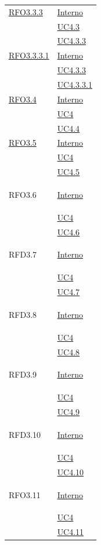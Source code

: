 \begin{itemize}
\begin{itemize}
\begin{itemize}
\begin{itemize}
\begin{longtable}{|>{\centering}m{5cm}|m{5cm}<{\centering}|}
\hyperlink{RFO3.3.3}{RFO3.3.3} & \hyperlink{Interno}{Interno}\\
& \hyperref[UC4.3]{UC4.3}\\
& \hyperref[UC4.3.3]{UC4.3.3}\\ \hline

\hyperlink{RFO3.3.3.1}{RFO3.3.3.1} & \hyperlink{Interno}{Interno}\\
& \hyperref[UC4.3.3]{UC4.3.3}\\
& \hyperref[UC4.3.3.1]{UC4.3.3.1}\\ \hline

\hyperlink{RFO3.4}{RFO3.4} & \hyperlink{Interno}{Interno}\\
& \hyperref[UC4]{UC4}\\
& \hyperref[UC4.4]{UC4.4}\\ \hline

\hyperlink{RFO3.5}{RFO3.5} & \hyperlink{Interno}{Interno}\\
& \hyperref[UC4]{UC4}\\
& \hyperref[UC4.5]{UC4.5}\\ \hline

\hypertarget{RFO3.6}{RFO3.6} & \hyperlink{Interno}{Interno}\\
&\hyperref[UC4]{UC4}\\
&\hyperref[UC4.6]{UC4.6}\\ \hline

\hypertarget{RFD3.7}{RFD3.7} & \hyperlink{Interno}{Interno}\\
& \hyperref[UC4]{UC4}\\
& \hyperref[UC4.7]{UC4.7}\\ \hline

\hypertarget{RFD3.8}{RFD3.8} & \hyperlink{Interno}{Interno}\\
& \hyperref[UC4]{UC4}\\
& \hyperref[UC4.8]{UC4.8}\\ \hline

\hypertarget{RFD3.9}{RFD3.9} & \hyperlink{Interno}{Interno}\\
& \hyperref[UC4]{UC4}\\
& \hyperref[UC4.9]{UC4.9}\\ \hline

\hypertarget{RFD3.10}{RFD3.10} & \hyperlink{Interno}{Interno}\\
& \hyperref[UC4]{UC4}\\
& \hyperref[UC4.10]{UC4.10}\\ \hline

\hypertarget{RFO3.11}{RFO3.11} & \hyperlink{Interno}{Interno}\\
& \hyperref[UC4]{UC4}\\
& \hyperref[UC4.11]{UC4.11}\\ \hline


\end{longtable}
\end{itemize}
\end{itemize}
\end{itemize}
\end{itemize}
